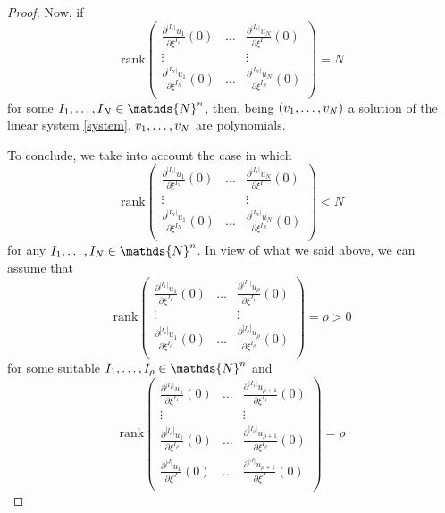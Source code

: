 \documentclass[11pt, reqno]{amsart}
\newcommand{\de}{\partial}
\newcommand{\N}{\mathds{N}}
\begin{document}
\begin{proof}
\smallskip\noindent
Now, if
$$\mathrm{rank} \begin{pmatrix}
\frac{\de^{|I_1|}  u_1}{\de\xi^{I_1}}(0) &\dots&\frac{\de^{|I_1|}  u_N}{\de\xi^{I_1}}(0) \\
\vdots& &\vdots\\
\frac{\de^{|I_N|}  u_1}{\de\xi^{I_N}}(0) &\dots&\frac{\de^{|I_N|}  u_N}{\de\xi^{I_N}}(0) \\
\end{pmatrix}=N$$
for some $I_1,\mathellipsis,I_N\in\N^n$, then, being $(v_1,\mathellipsis,v_N)$ a solution of the linear system \eqref{system}, $v_1,\mathellipsis,v_N$ are polynomials.


\noindent
To conclude, we take into account the case in which
$$\mathrm{rank} \begin{pmatrix}
\frac{\de^{|I_1|} u_1}{\de\xi^{I_1}}(0) &\dots&\frac{\de^{|I_1|} u_N}{\de\xi^{I_1}}(0) \\
\vdots& &\vdots\\
\frac{\de^{|I_N|} u_1}{\de\xi^{I_N}}(0) &\dots&\frac{\de^{|I_N|} u_N}{\de\xi^{I_N}}(0) \\
\end{pmatrix}<N$$
for any $I_1,\mathellipsis,I_N\in\N^n$. In view of what we said above, we can assume that
\begin{equation}\label{rank1}
\mathrm{rank} \begin{pmatrix}
\frac{\de^{|I_1|} u_1}{\de\xi^{I_1}}(0) &\dots&\frac{\de^{|I_1|} u_\rho}{\de\xi^{I_1}}(0) \\
\vdots& &\vdots\\
\frac{\de^{|I_\rho|} u_1}{\de\xi^{I_\rho}}(0) &\dots&\frac{\de^{|I_\rho|} u_\rho}{\de\xi^{I_\rho}}(0) \\
\end{pmatrix}=\rho>0\end{equation}
for some suitable  $I_1,\mathellipsis,I_\rho\in\N^n$ and
\begin{equation}\label{rank2}
\mathrm{rank} \begin{pmatrix}
\frac{\de^{|I_1|} u_1}{\de\xi^{I_1}}(0) &\dots&\frac{\de^{|I_1|}  u_{\rho+1}}{\de\xi^{I_1}}(0) \\
\vdots& &\vdots\\
\frac{\de^{|I_\rho|}  u_1}{\de\xi^{I_\rho}}(0) &\dots&\frac{\de^{|I_\rho|} u_{\rho+1}}{\de\xi^{I_\rho}}(0) \\
\frac{\de^{|J|} u_1}{\de\xi^{J}}(0) &\dots&\frac{\de^{|J|} u_{\rho+1}}{\de\xi^{J}}(0) \\
\end{pmatrix}=\rho\end{equation}

\end{proof}
\end{document}
